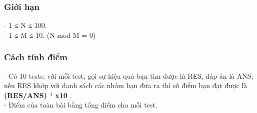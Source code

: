 \subsubsection{   Giới hạn  }

   - 1 ≤ N ≤ 100.   
\\   - 1 ≤ M ≤ 10. (N mod M = 0)  

\subsubsection{   Cách tính điểm  }

   - Có 10 tests; với mỗi test, gọi sự hiệu quả bạn tìm được là RES, đáp án là ANS; nếu RES khớp với danh sách các nhóm bạn đưa ra thì số điểm bạn đạt được là   \textbf{    (RES/ANS)    $^     4    $    x10   }   .   
\\   - Điểm của toàn bài bằng tổng điểm cho mỗi test.  

